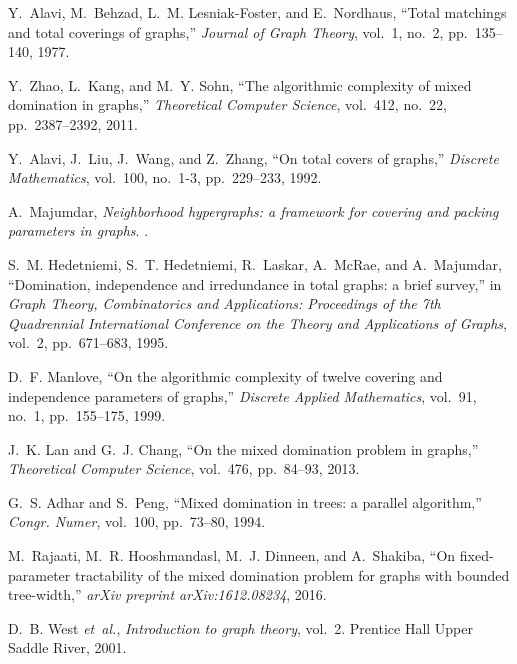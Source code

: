 \documentclass[12pt]{article}
\theoremstyle{definition}
\theoremstyle{remark}
\begin{document}
%
%
%
\begin{thebibliography}{10}
	
	Y.~Alavi, M.~Behzad, L.~M. Lesniak-Foster, and E.~Nordhaus, ``Total matchings
	and total coverings of graphs,'' {\em Journal of Graph Theory}, vol.~1,
	no.~2, pp.~135--140, 1977.
	
	Y.~Zhao, L.~Kang, and M.~Y. Sohn, ``The algorithmic complexity of mixed
	domination in graphs,'' {\em Theoretical Computer Science}, vol.~412, no.~22,
	pp.~2387--2392, 2011.
	
	Y.~Alavi, J.~Liu, J.~Wang, and Z.~Zhang, ``On total covers of graphs,'' {\em
		Discrete Mathematics}, vol.~100, no.~1-3, pp.~229--233, 1992.
	
	A.~Majumdar, {\em Neighborhood hypergraphs: a framework for covering and
		packing parameters in graphs}.
	.
	
	S.~M. Hedetniemi, S.~T. Hedetniemi, R.~Laskar, A.~McRae, and A.~Majumdar,
	``Domination, independence and irredundance in total graphs: a brief
	survey,'' in {\em Graph Theory, Combinatorics and Applications: Proceedings
		of the 7th Quadrennial International Conference on the Theory and
		Applications of Graphs}, vol.~2, pp.~671--683, 1995.
	
	D.~F. Manlove, ``On the algorithmic complexity of twelve covering and
	independence parameters of graphs,'' {\em Discrete Applied Mathematics},
	vol.~91, no.~1, pp.~155--175, 1999.
	
	J.~K. Lan and G.~J. Chang, ``On the mixed domination problem in graphs,'' {\em
		Theoretical Computer Science}, vol.~476, pp.~84--93, 2013.
	
	G.~S. Adhar and S.~Peng, ``Mixed domination in trees: a parallel algorithm,''
	{\em Congr. Numer}, vol.~100, pp.~73--80, 1994.
	
	M.~Rajaati, M.~R. Hooshmandasl, M.~J. Dinneen, and A.~Shakiba, ``On
	fixed-parameter tractability of the mixed domination problem for graphs with
	bounded tree-width,'' {\em arXiv preprint arXiv:1612.08234}, 2016.
	
	D.~B. West {\em et~al.}, {\em Introduction to graph theory}, vol.~2.
	\newblock Prentice Hall Upper Saddle River, 2001.
	

\end{thebibliography}
\end{document}
